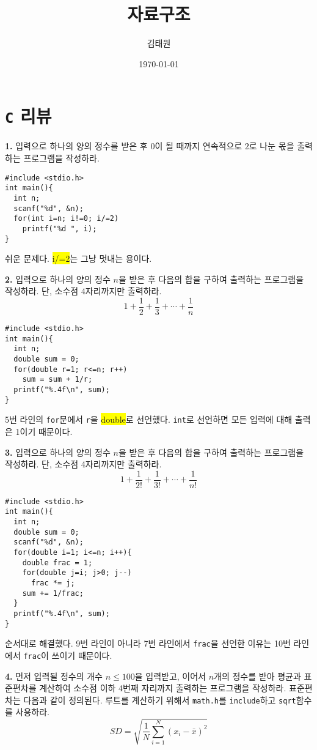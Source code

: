 \documentclass[a4paper,chapter,atbegshi]{oblivoir}
\title{자료구조}
\author{김태원}
\date{\today}
\begin{document}
\maketitle
\chapter{\texttt{C} 리뷰}
\begin{mdframed}\textbf{1. }
  입력으로 하나의 양의 정수를 받은 후 $0$이 될 때까지 연속적으로 $2$로 나눈 몫을
  출력하는 프로그램을 작성하라.
\end{mdframed}
\begin{lstlisting}[style=C]
#include <stdio.h>
int main(){
  int n;
  scanf("%d", &n);
  for(int i=n; i!=0; i/=2)
    printf("%d ", i);
}
\end{lstlisting}
쉬운 문제다. \colorbox{yellow}{\ttfamily i/=2}는 그냥 멋내는 용이다.
\hfill\break
\begin{mdframed}\textbf{2. }
  입력으로 하나의 양의 정수 $n$을 받은 후 다음의 합을 구하여 출력하는 프로그램을
  작성하라. 단, 소수점 $4$자리까지만 출력하라.
  \[
    1 + \frac{1}{2}+\frac{1}{3}+\cdots+\frac{1}{n}
  \]
\end{mdframed}
\begin{lstlisting}[style=C]
#include <stdio.h>
int main(){
  int n;
  double sum = 0;
  for(double r=1; r<=n; r++)
    sum = sum + 1/r;
  printf("%.4f\n", sum);
}
\end{lstlisting}
5번 라인의 \texttt{for}문에서 \texttt{r}을 \colorbox{yellow}{\ttfamily double}로
선언했다. \texttt{int}로 선언하면 모든 입력에 대해 출력은 1이기 때문이다.
\hfill\break
\begin{mdframed}\textbf{3. }
  입력으로 하나의 양의 정수 $n$을 받은 후 다음의 합을 구하여 출력하는 프로그램을
  작성하라. 단, 소수점 4자리까지만 출력하라.
  \[
    1+\frac{1}{2!}+\frac{1}{3!}+\cdots+\frac{1}{n!}
  \]
\end{mdframed}
\begin{lstlisting}[style=C]
#include <stdio.h>
int main(){
  int n;
  double sum = 0;
  scanf("%d", &n);
  for(double i=1; i<=n; i++){
    double frac = 1;
    for(double j=i; j>0; j--)
      frac *= j;
    sum += 1/frac;
  }
  printf("%.4f\n", sum);
}
\end{lstlisting}
순서대로 해결했다. 9번 라인이 아니라 7번 라인에서 \texttt{frac}을 선언한
이유는 10번 라인에서 \texttt{frac}이 쓰이기 때문이다.
\hfill\break
\begin{mdframed}\textbf{4. }
  먼저 입력될 정수의 개수 $n\leq100$을 입력받고, 이어서 $n$개의 정수를 받아
  평균과 표준편차를 계산하여 소수점 이하 4번째 자리까지 출력하는 프로그램을
  작성하라. 표준편차는 다음과 같이 정의된다. 루트를 계산하기 위해서 
  \texttt{math.h}를 \texttt{include}하고 \texttt{sqrt}함수를 사용하라.
  \[
    SD = \sqrt{\frac{1}{N}\sum_{i=1}^N(x_i-\bar{x})^2}
  \]
\end{mdframed}
\end{document}
